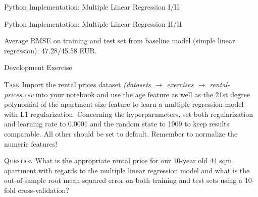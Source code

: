 \documentclass[document.tex]{subfiles}
\begin{document}
    \begin{frame}{Python Implementation: Multiple Linear Regression I/II}
        
    \end{frame}

    \begin{frame}{Python Implementation: Multiple Linear Regression II/II}
        
        Average RMSE on training and test set from baseline model (simple linear regression): 47.28/45.58 EUR.
    \end{frame}

    \begin{frame}{Development Exercise }
        \begin{alertblock}{\textsc{Task}}
            Import the rental prices dataset \textit{(datasets $\rightarrow$ exercises $\rightarrow$ rental-prices.csv} into your notebook and use the age feature as well as the 21st degree polynomial of the apartment size feature to learn a multiple regression model with L1 regularization. Concerning the hyperparameters, set both regularization and learning rate to 0.0001 and the random state to 1909 to keep results comparable. All other should be set to default. Remember to normalize the numeric features!
        \end{alertblock}
        \begin{alertblock}{\textsc{Question}}
            What is the appropriate rental price for our 10-year old 44 sqm apartment with regards to the multiple linear regression model and what is the out-of-sample root mean squared error on both training and test sets using a 10-fold cross-validation?
        \end{alertblock}
    \end{frame}
\end{document}
